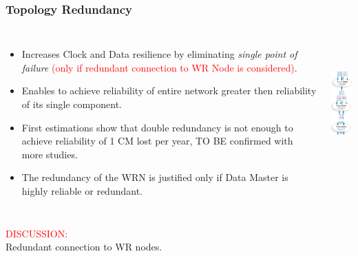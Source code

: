\documentclass[]{beamer}
\begin{document}
\begin{frame}
  \frametitle{Topology Redundancy}   

  \begin{columns}[c]
  \column{3.8in} 

  \begin{itemize}
  \item Increases Clock and Data resilience by eliminating \textit{single point
	of failure} \textcolor{red}{(only if redundant connection to WR Node is
	considered)}.
  \item Enables to achieve reliability of entire network greater then
	reliability of its single component.
  \item First estimations show that double redundancy is not enough to achieve
	reliability of 1 CM lost per year, TO BE confirmed with more studies.
  \item The redundancy of the WRN is justified only if Data Master is
	highly reliable or redundant.
  \end{itemize}

  \column{1.2in}
  \centering
  \includegraphics[height=5cm,keepaspectratio]{robustness/inOutOfWRN.pdf}

  \end{columns}
\centering
\textcolor{red}{DISCUSSION:} \\
Redundant connection to WR nodes.

\end{frame}
\end{document}
